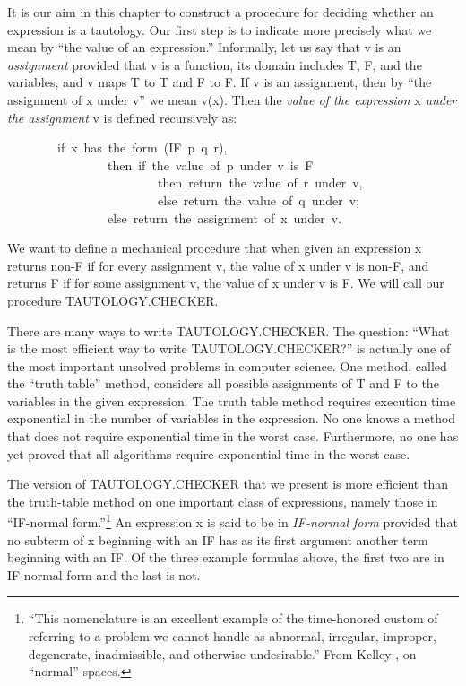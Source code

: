 \documentclass[10pt]{book}
\newenvironment{pubasis}{\begin{flushleft}}{\end{flushleft}}
\begin{document}
It is our aim in this chapter to construct a procedure
for deciding whether an expression is a tautology.
Our first step is to indicate more precisely what we mean by ``the value of
an expression.''  Informally, let us say that v
is  an \emph{assignment} provided that v is a function,
its domain includes T, F, and  the variables,
and v  maps T to T and F to F.
If v is an assignment, then by ``the assignment of x under v'' we
mean v(x).
Then  the \emph{value of the expression} x 
\emph{under the assignment} v is defined recursively as:
\begin{pubasis}
~~~~~~~~if~x~has~the~form~(IF~p~q~r),~\\
~~~~~~~~~~~~~~~~then~if~the~value~of~p~under~v~is~F\\
~~~~~~~~~~~~~~~~~~~~~~~~then~return~the~value~of~r~under~v,\\
~~~~~~~~~~~~~~~~~~~~~~~~else~return~the~value~of~q~under~v;\\
~~~~~~~~~~~~~~~~else~return~the~assignment~of~x~under~v.\\
\end{pubasis}
We want to define  a mechanical procedure that when given an expression x
returns non-F
if  for every assignment v, the value of x under v is non-F, and returns F
if for some assignment v, the value of x under v is F.  We will call
our procedure TAUTOLOGY.CHECKER.

There are many ways to write   TAUTOLOGY.CHECKER.  The question:
``What is the most efficient way to write TAUTOLOGY.CHECKER?'' is actually one
of the most important unsolved problems in computer science.
One  method, called the ``truth table'' method, considers all possible assignments of T and F to the variables
in the given expression.  The truth table
method requires execution time exponential in the number of variables
in the expression.  No one knows a method that
does not require exponential time in the worst case.  Furthermore,
no one has yet proved that all algorithms require exponential time
in the worst case.

The version of TAUTOLOGY.CHECKER that we present is more
efficient than the truth-table method on one important class of
expressions, namely those in ``IF-normal form.''\footnote{``This nomenclature is an excellent example of the time-honored  custom of referring to a problem we cannot handle as abnormal, irregular, improper, degenerate, inadmissible, and otherwise undesirable.''  From Kelley \cite{KELLEY}, on ``normal'' spaces.}
An expression x is said to be in \emph{IF-normal form} provided
that no subterm of x beginning with an IF has as its first argument
another term beginning with an  IF.
Of the three example formulas above, the first two are in
IF-normal form and the last is not.
\end{document}
